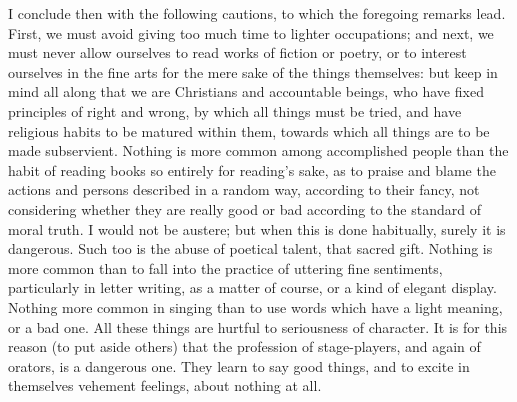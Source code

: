 I conclude then with the following cautions, to which the foregoing
remarks lead. First, we must avoid giving too much time to lighter
occupations; and next, we must never allow ourselves to read works of
fiction or poetry, or to interest ourselves in the fine arts for the
mere sake of the things themselves: but keep in mind all along that we
are Christians and accountable beings, who have fixed principles of
right and wrong, by which all things must be tried, and have religious
habits to be matured within them, towards which all things are to be
made subservient. Nothing is more common among accomplished people than
the habit of reading books so entirely for reading's sake, as to praise
and blame the actions and persons described in a random way, according
to their fancy, not considering whether they are really good or bad
according to the standard of moral truth. I would not be austere; but
when this is done habitually, surely it is dangerous. Such too is the
abuse of poetical talent, that sacred gift. Nothing is more common than
to fall into the practice of uttering fine sentiments, particularly in
letter writing, as a matter of course, or a kind of elegant display.
Nothing more common in singing than to use words which have a light
meaning, or a bad one. All these things are hurtful to seriousness of
character. It is for this reason (to put aside others) that the
profession of stage-players, and again of orators, is a dangerous one.
They learn to say good things, and to excite in themselves vehement
feelings, about nothing at all.

